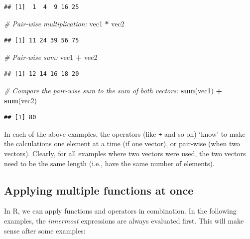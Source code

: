 \documentclass[]{book}
\newenvironment{Shaded}{\begin{snugshade}}{\end{snugshade}}
\newcommand{\CommentTok}[1]{\textcolor[rgb]{0.56,0.35,0.01}{\textit{#1}}}
\newcommand{\KeywordTok}[1]{\textcolor[rgb]{0.13,0.29,0.53}{\textbf{#1}}}
\newcommand{\NormalTok}[1]{#1}
\newcommand{\OperatorTok}[1]{\textcolor[rgb]{0.81,0.36,0.00}{\textbf{#1}}}
\newcommand{\StringTok}[1]{\textcolor[rgb]{0.31,0.60,0.02}{#1}}
\begin{document}
\begin{verbatim}
## [1]  1  4  9 16 25
\end{verbatim}

\begin{Shaded}
\begin{Highlighting}[]
\CommentTok{# Pair-wise multiplication:}
\NormalTok{vec1 }\OperatorTok{*}\StringTok{ }\NormalTok{vec2}
\end{Highlighting}
\end{Shaded}

\begin{verbatim}
## [1] 11 24 39 56 75
\end{verbatim}

\begin{Shaded}
\begin{Highlighting}[]
\CommentTok{# Pair-wise sum:}
\NormalTok{vec1 }\OperatorTok{+}\StringTok{ }\NormalTok{vec2}
\end{Highlighting}
\end{Shaded}

\begin{verbatim}
## [1] 12 14 16 18 20
\end{verbatim}

\begin{Shaded}
\begin{Highlighting}[]
\CommentTok{# Compare the pair-wise sum to the sum of both vectors:}
\KeywordTok{sum}\NormalTok{(vec1) }\OperatorTok{+}\StringTok{ }\KeywordTok{sum}\NormalTok{(vec2)}
\end{Highlighting}
\end{Shaded}

\begin{verbatim}
## [1] 80
\end{verbatim}

In each of the above examples, the operators (like \texttt{+} and so on) `know' to make the calculations one element at a time (if one vector), or pair-wise (when two vectors). Clearly, for all examples where two vectors were used, the two vectors need to be the same length (i.e., have the same number of elements).

\hypertarget{multifunctions}{%
\subsection{Applying multiple functions at once}\label{multifunctions}}

In R, we can apply functions and operators in combination. In the following examples, the \emph{innermost} expressions are always evaluated first. This will make sense after some examples:
\end{document}
